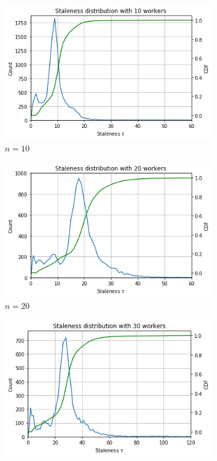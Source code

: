 \begin{figure}
  \centering
  \begin{subfigure}{.45\textwidth}
    \centering
    \includegraphics[width=\linewidth]{resources/images/staleness_10}
    \caption{$n = 10$}
    \label{fig:staleness_distribution_10}
  \end{subfigure}
  \begin{subfigure}{.45\textwidth}
     \centering
     \includegraphics[width=\linewidth]{resources/images/staleness_20}
     \caption{$n = 20$}
    \label{fig:staleness_distribution_20}
  \end{subfigure}
  \begin{subfigure}{.45\textwidth}
     \centering
     \includegraphics[width=\linewidth]{resources/images/staleness_30}

\end{subfigure}
\end{figure}

